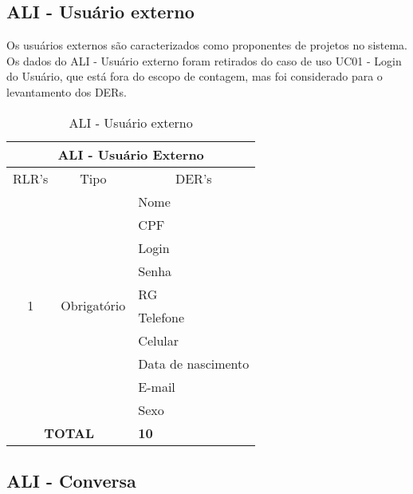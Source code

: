   
  \subsection{ALI - Usuário externo}
    
    Os usuários externos são caracterizados como proponentes de projetos no sistema.
    Os dados do ALI - Usuário externo foram retirados do caso de uso UC01 - Login do Usuário, que está fora do escopo 
    de contagem, mas foi considerado para o levantamento dos DERs.
    
    \begin{table}[!h]
    \centering
    \caption{ALI - Usuário externo}
    \label{ali_usuario_externo}
    \begin{tabular}{|c|c|l|}
    \hline
    \multicolumn{3}{|c|}{ALI - Usuário Externo}                                              \\ \hline
    \multicolumn{1}{|l|}{RLR's} & Tipo                          & \multicolumn{1}{c|}{DER's} \\ \hline
    \multirow{10}{*}{1}         & \multirow{10}{*}{Obrigatório} & Nome                       \\ \cline{3-3} 
				&                               & CPF                        \\ \cline{3-3} 
				&                               & Login                      \\ \cline{3-3} 
				&                               & Senha                      \\ \cline{3-3} 
				&                               & RG                         \\ \cline{3-3} 
				&                               & Telefone                   \\ \cline{3-3} 
				&                               & Celular                    \\ \cline{3-3} 
				&                               & Data de nascimento         \\ \cline{3-3} 
				&                               & E-mail                     \\ \cline{3-3} 
				&                               & Sexo                       \\ \hline
    \multicolumn{2}{|c|}{\textbf{TOTAL}} & \textbf{10} \\ \hline
    \end{tabular}
    \end{table}
    
      \subsection{ALI - Conversa}
    
